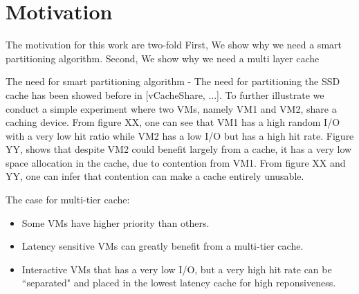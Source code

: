 
\section{Motivation}
The motivation for this work are two-fold First, We show why we need a smart partitioning algorithm. Second, We show why we need a multi layer cache

The need for smart partitioning algorithm - The need for partitioning the SSD cache has been showed before in [vCacheShare, ...]. To further illustrate we conduct a simple experiment where two VMs, namely VM1 and VM2, share a caching device. From figure XX, one can see that VM1 has a high random I/O with a very low hit ratio while VM2 has a low I/O but has a high hit rate. Figure YY, shows that despite VM2 could benefit largely from a cache, it has a very low space allocation in the cache, due to contention from VM1. From figure XX and YY, one can infer that contention can make a cache entirely unusable.

The case for multi-tier cache:
\begin{itemize}
\item Some VMs have higher priority than others.
\item Latency sensitive VMs can greatly benefit from a multi-tier cache.
\item Interactive VMs that has a very low I/O, but a very high hit rate can be ``separated" and placed in the lowest latency cache for high reponsiveness.
\end{itemize}
